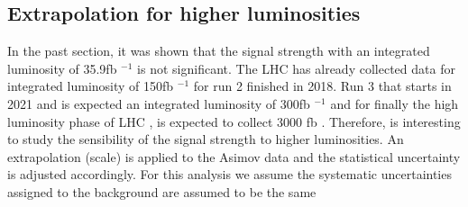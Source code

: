 \begin{linenumbers}
	\section{Extrapolation for higher luminosities}
	In the past section, it was shown that the signal strength  with an integrated luminosity of 35.9fb $^{-1}$ is not significant. The LHC has already collected data for integrated luminosity of 150fb $^{-1}$ for run 2 finished in 2018. Run 3 that starts in 2021 and is expected an integrated luminosity of 300fb $^{-1}$ and for finally the high luminosity phase of LHC , is expected to collect 3000 fb . Therefore, is interesting to study the sensibility of the signal  strength to higher luminosities. 
	An extrapolation (scale) is applied to the Asimov data and the statistical uncertainty is adjusted accordingly. For this analysis we assume the systematic uncertainties assigned to the background are assumed to be the same
	\pagebreak
	

\end{linenumbers}
